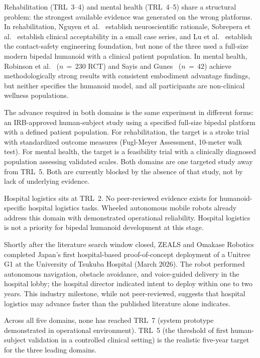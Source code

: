 \documentclass[acmjour]{acmart}
\begin{document}
Rehabilitation (TRL~3--4) and mental health (TRL~4--5) share a structural
problem: the strongest available evidence
was generated on the wrong platforms. In rehabilitation, Nguyen et
al.~\cite{nguyen2024eeg} establish neuroscientific rationale, Sobrepera et
al.~\cite{sobrepera2022feasibility} establish clinical acceptability in a small
case series, and Lu et al.~\cite{lu2025gentlehumanoid} establish the
contact-safety engineering foundation, but none of the three used a full-size
modern bipedal humanoid with a clinical patient population. In mental health,
Robinson et al.~\cite{robinson2023brief} ($n\,=\,230$ RCT) and Sayis and
Gunes~\cite{sayis2024technology} ($n\,=\,42$) achieve methodologically strong
results with consistent embodiment advantage findings, but neither specifies the
humanoid model, and all participants are non-clinical wellness populations.

The advance required in both domains is the same experiment in different forms:
an IRB-approved human-subject study using a specified full-size bipedal platform
with a defined patient population. For rehabilitation, the target is a stroke
trial with standardized outcome measures (Fugl-Meyer Assessment,
10-meter walk test). For mental health, the target is a feasibility trial with a
clinically diagnosed population assessing validated scales. Both domains are one
targeted study away from TRL~5. Both are currently blocked by the absence of
that study, not by lack of underlying evidence.

Hospital logistics sits at TRL~2. No peer-reviewed evidence exists for
humanoid-specific hospital logistics tasks. Wheeled autonomous mobile robots
already address this domain with demonstrated operational reliability. Hospital
logistics is not a priority for bipedal humanoid development at this stage.

Shortly after the literature search window closed, ZEALS and Omakase Robotics
completed Japan's first hospital-based proof-of-concept deployment of a Unitree
G1 at the University of Tsukuba Hospital (March 2026). The robot performed
autonomous navigation, obstacle avoidance, and voice-guided delivery in the
hospital lobby; the hospital director indicated intent to deploy within one to
two years. This industry milestone, while not peer-reviewed, suggests that
hospital logistics may advance faster than the published literature alone
indicates.

Across all five domains, none has reached TRL~7 (system prototype
demonstrated in operational environment). TRL~5 (the threshold of first
human-subject validation in a controlled clinical setting) is the realistic
five-year target for the three leading domains.
\end{document}
